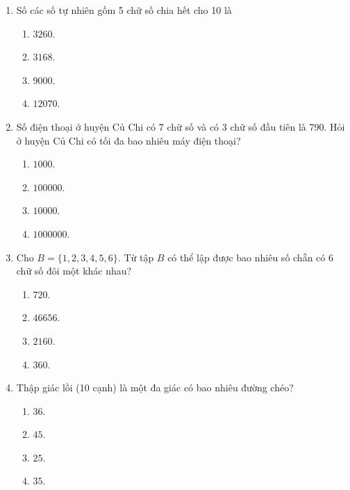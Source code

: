 \begin{enumerate}[label=\textbf{Câu \arabic*.},align=left,left=0cm..0cm,itemindent=*]
\begin{multicols}{4}
\begin{enumerate}[label=\textbf{\Alph*.},align=left,left=1cm..0cm,itemindent=*]
		\item $25$. \item $75$. \item $100$. \item $15$.
	\end{enumerate}\end{multicols}
	\item Số các số tự nhiên gồm 5 chữ số chia hết cho 10 là
	\begin{multicols}{4}\begin{enumerate}[label=\textbf{\Alph*.},align=left,left=1cm..0cm,itemindent=*]
		\item $3260$. \item $3168$. \item $9000$. \item $12070$.
	\end{enumerate}\end{multicols}
	\item Số điện thoại ở huyện Củ Chi có 7 chữ số và có 3 chữ số đầu tiên là 790. Hỏi ở huyện Củ Chi có tối đa bao nhiêu máy điện thoại?
	\begin{multicols}{4}\begin{enumerate}[label=\textbf{\Alph*.},align=left,left=1cm..0cm,itemindent=*]
		\item $1000$. \item $100000$. \item $10000$. \item $1000000$.
	\end{enumerate}\end{multicols}
	\item Cho $B=\{1,2,3,4,5,6\}$. Từ tập $B$ có thể lập được bao nhiêu số chẵn có 6 chữ số đôi một khác nhau?
	\begin{multicols}{4}\begin{enumerate}[label=\textbf{\Alph*.},align=left,left=1cm..0cm,itemindent=*]
		\item $720$. \item $46656$. \item $2160$. \item $360$.
	\end{enumerate}\end{multicols}
	\item Thập giác lồi (10 cạnh) là một đa giác có bao nhiêu đường chéo?
	\begin{multicols}{4}\begin{enumerate}[label=\textbf{\Alph*.},align=left,left=1cm..0cm,itemindent=*]
		\item $36$. \item $45$. \item $25$. \item $35$.

\end{enumerate}
\end{multicols}
\end{enumerate}
